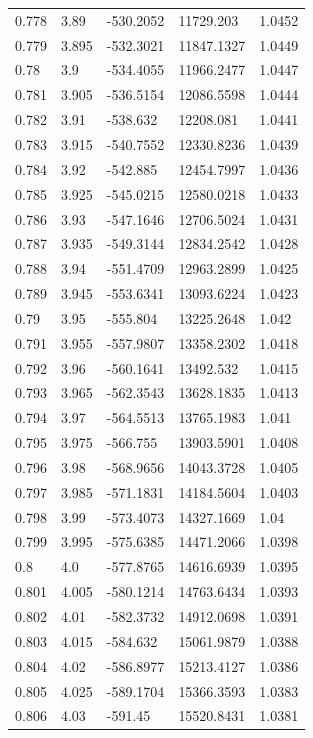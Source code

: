 \begin{tabular}{lllll}
0.778 & 3.89 & -530.2052 & 11729.203 & 1.0452 \\
0.779 & 3.895 & -532.3021 & 11847.1327 & 1.0449 \\
0.78 & 3.9 & -534.4055 & 11966.2477 & 1.0447 \\
0.781 & 3.905 & -536.5154 & 12086.5598 & 1.0444 \\
0.782 & 3.91 & -538.632 & 12208.081 & 1.0441 \\
0.783 & 3.915 & -540.7552 & 12330.8236 & 1.0439 \\
0.784 & 3.92 & -542.885 & 12454.7997 & 1.0436 \\
0.785 & 3.925 & -545.0215 & 12580.0218 & 1.0433 \\
0.786 & 3.93 & -547.1646 & 12706.5024 & 1.0431 \\
0.787 & 3.935 & -549.3144 & 12834.2542 & 1.0428 \\
0.788 & 3.94 & -551.4709 & 12963.2899 & 1.0425 \\
0.789 & 3.945 & -553.6341 & 13093.6224 & 1.0423 \\
0.79 & 3.95 & -555.804 & 13225.2648 & 1.042 \\
0.791 & 3.955 & -557.9807 & 13358.2302 & 1.0418 \\
0.792 & 3.96 & -560.1641 & 13492.532 & 1.0415 \\
0.793 & 3.965 & -562.3543 & 13628.1835 & 1.0413 \\
0.794 & 3.97 & -564.5513 & 13765.1983 & 1.041 \\
0.795 & 3.975 & -566.755 & 13903.5901 & 1.0408 \\
0.796 & 3.98 & -568.9656 & 14043.3728 & 1.0405 \\
0.797 & 3.985 & -571.1831 & 14184.5604 & 1.0403 \\
0.798 & 3.99 & -573.4073 & 14327.1669 & 1.04 \\
0.799 & 3.995 & -575.6385 & 14471.2066 & 1.0398 \\
0.8 & 4.0 & -577.8765 & 14616.6939 & 1.0395 \\
0.801 & 4.005 & -580.1214 & 14763.6434 & 1.0393 \\
0.802 & 4.01 & -582.3732 & 14912.0698 & 1.0391 \\
0.803 & 4.015 & -584.632 & 15061.9879 & 1.0388 \\
0.804 & 4.02 & -586.8977 & 15213.4127 & 1.0386 \\
0.805 & 4.025 & -589.1704 & 15366.3593 & 1.0383 \\
0.806 & 4.03 & -591.45 & 15520.8431 & 1.0381 \\

\end{tabular}
